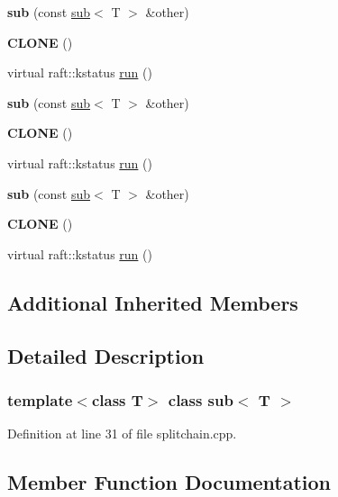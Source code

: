\begin{DoxyCompactItemize}
{\bfseries sub} (const \hyperlink{classsub}{sub}$<$ T $>$ \&other)
\item 
\hypertarget{classsub_ae51496c5801b301aa89045d58c7d5f24}{}\label{classsub_ae51496c5801b301aa89045d58c7d5f24} 
{\bfseries C\+L\+O\+NE} ()
\item 
virtual raft\+::kstatus \hyperlink{classsub_a0a0c7461433ee8b5f4b24305282bf69a}{run} ()
\item 
\hypertarget{classsub_a4ac64767baaddc87027b262dac5528e0}{}\label{classsub_a4ac64767baaddc87027b262dac5528e0} 
{\bfseries sub} (const \hyperlink{classsub}{sub}$<$ T $>$ \&other)
\item 
\hypertarget{classsub_ae51496c5801b301aa89045d58c7d5f24}{}\label{classsub_ae51496c5801b301aa89045d58c7d5f24} 
{\bfseries C\+L\+O\+NE} ()
\item 
virtual raft\+::kstatus \hyperlink{classsub_a0a0c7461433ee8b5f4b24305282bf69a}{run} ()
\item 
\hypertarget{classsub_a4ac64767baaddc87027b262dac5528e0}{}\label{classsub_a4ac64767baaddc87027b262dac5528e0} 
{\bfseries sub} (const \hyperlink{classsub}{sub}$<$ T $>$ \&other)
\item 
\hypertarget{classsub_ae51496c5801b301aa89045d58c7d5f24}{}\label{classsub_ae51496c5801b301aa89045d58c7d5f24} 
{\bfseries C\+L\+O\+NE} ()
\item 
virtual raft\+::kstatus \hyperlink{classsub_a0a0c7461433ee8b5f4b24305282bf69a}{run} ()
\end{DoxyCompactItemize}
\subsection*{Additional Inherited Members}


\subsection{Detailed Description}
\subsubsection*{template$<$class T$>$\newline
class sub$<$ T $>$}



Definition at line 31 of file splitchain.\+cpp.



\subsection{Member Function Documentation}
\hypertarget{classsub_a0a0c7461433ee8b5f4b24305282bf69a}{}\label{classsub_a0a0c7461433ee8b5f4b24305282bf69a} 
